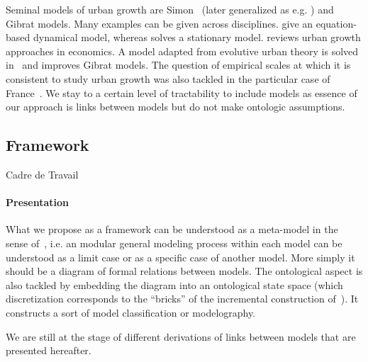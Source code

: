 Seminal models of urban growth are Simon~\cite{simon1955class} (later generalized as e.g. \cite{haran1973modified}) and Gibrat models. Many examples can be given across disciplines. \cite{benguigui2007dynamic} give an equation-based dynamical model, whereas \cite{gabaix1999zipf} solves a stationary model. \cite{Gabaix20042341} reviews urban growth approaches in economics. A model adapted from evolutive urban theory is solved in~\cite{favaro2011gibrat} and improves Gibrat models. The question of empirical scales at which it is consistent to study urban growth was also tackled in the particular case of France~\cite{bretagnolle2002time}. We stay to a certain level of tractability to include models as essence of our approach is links between models but do not make ontologic assumptions.




\subsection{Framework}{Cadre de Travail}


\paragraph{Presentation}
What we propose as a framework can be understood as a meta-model in the sense of~\cite{cottineau2015incremental}, i.e. an modular general modeling process within each model can be understood as a limit case or as a specific case of another model. More simply it should be a diagram of formal relations between models. The ontological aspect is also tackled by embedding the diagram into an ontological state space (which discretization corresponds to the ``bricks'' of the incremental construction of~\cite{cottineau2015incremental}). It constructs a sort of model classification or modelography.

We are still at the stage of different derivations of links between models that are presented hereafter.






